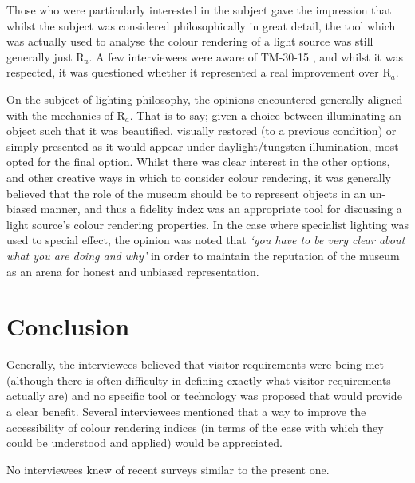 Those who were particularly interested in the subject gave the impression that whilst the subject was considered philosophically in great detail, the tool which was actually used to analyse the colour rendering of a light source was still generally just R$_a$. A few interviewees were aware of TM-30-15 \citep{color_metric_task_group_of_the_ies_ies_2015}, and whilst it was respected, it was questioned whether it represented a real improvement over R$_a$.

On the subject of lighting philosophy, the opinions encountered generally aligned with the mechanics of R$_a$. That is to say; given a choice between illuminating an object such that it was beautified, visually restored (to a previous condition) or simply presented as it would appear under daylight/tungsten illumination, most opted for the final option. Whilst there was clear interest in the other options, and other creative ways in which to consider colour rendering, it was generally believed that the role of the museum should be to represent objects in an un-biased manner, and thus a fidelity index was an appropriate tool for discussing a light source's colour rendering properties. In the case where specialist lighting was used to special effect, the opinion was noted that \textit{`you have to be very clear about what you are doing and why'} in order to maintain the reputation of the museum as an arena for honest and unbiased representation.

\section{Conclusion}
Generally, the interviewees believed that visitor requirements were being met (although there is often difficulty in defining exactly what visitor requirements actually are) and no specific tool or technology was proposed that would provide a clear benefit. Several interviewees mentioned that a way to improve the accessibility of colour rendering indices (in terms of the ease with which they could be understood and applied) would be appreciated.

No interviewees knew of recent surveys similar to the present one.